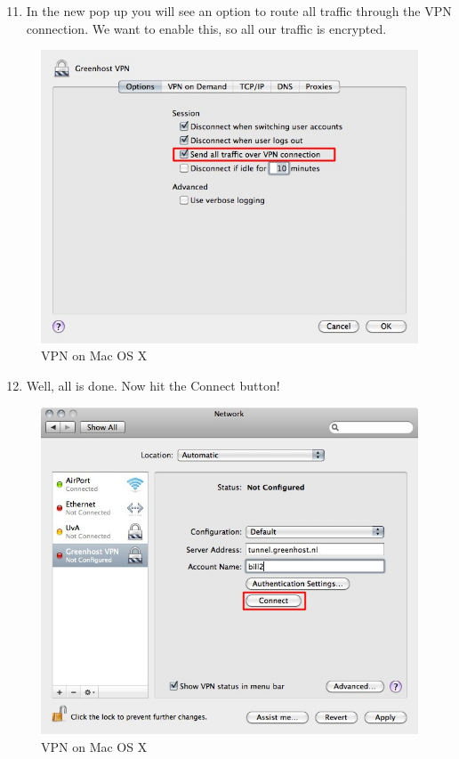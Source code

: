 \begin{enumerate}[1.]
\setcounter{enumi}{10}
\item
  In the new pop up you will see an option to route all traffic through
  the VPN connection. We want to enable this, so all our traffic is
  encrypted.
\end{enumerate}
\begin{figure}[htbp]
\centering
\includegraphics{vpn_osx_10.jpg}
\caption{VPN on Mac OS X}
\end{figure}

\begin{enumerate}[1.]
\setcounter{enumi}{11}
\item
  Well, all is done. Now hit the Connect button!
\end{enumerate}
\begin{figure}[htbp]
\centering
\includegraphics{vpn_osx_11.jpg}
\caption{VPN on Mac OS X}
\end{figure}

